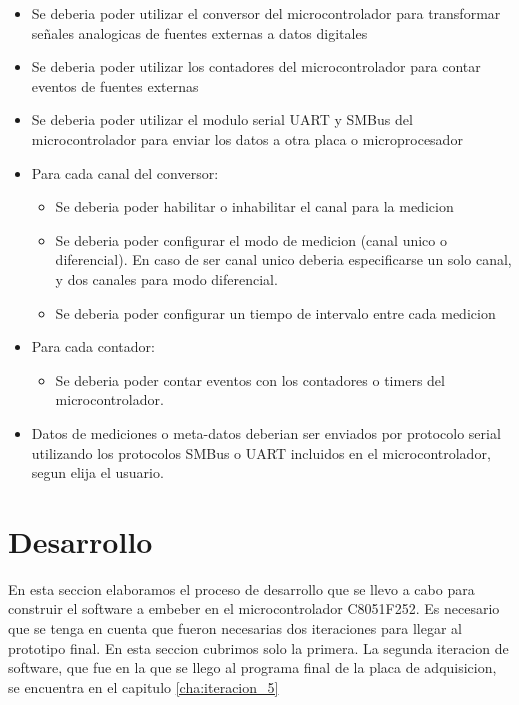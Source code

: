 \begin{itemize}
\item Se deberia poder utilizar el conversor del microcontrolador para transformar señales analogicas de fuentes externas a datos digitales
\item Se deberia poder utilizar los contadores del microcontrolador para contar eventos de fuentes externas
\item Se deberia poder utilizar el modulo serial UART y SMBus del microcontrolador para enviar los datos a otra placa o microprocesador
\item Para cada canal del conversor:
\begin{itemize}
\item Se deberia poder habilitar o inhabilitar el canal para la medicion
\item Se deberia poder configurar el modo de medicion (canal unico o diferencial). En caso de ser canal unico deberia especificarse un solo canal, y dos canales para modo diferencial.
\item Se deberia poder configurar un tiempo de intervalo entre cada medicion
\end{itemize}
\item Para cada contador:
\begin{itemize}
\item Se deberia poder contar eventos con los contadores o timers del microcontrolador.
\end{itemize}
\item Datos de mediciones o meta-datos deberian ser enviados por protocolo serial utilizando los protocolos SMBus o UART incluidos en el microcontrolador, segun elija el usuario.

\end{itemize}



\section{Desarrollo} %
\label{it2:sec:desarrollo}

En esta seccion elaboramos el proceso de desarrollo que se llevo a cabo para construir el software a embeber en el microcontrolador C8051F252\cite{c8051f352}. Es necesario que se tenga en cuenta que fueron necesarias dos iteraciones para llegar al prototipo final. En esta seccion cubrimos solo la primera. La segunda iteracion de software, que fue en la que se llego al programa final de la placa de adquisicion, se encuentra en el capitulo \ref{cha:iteracion_5}

